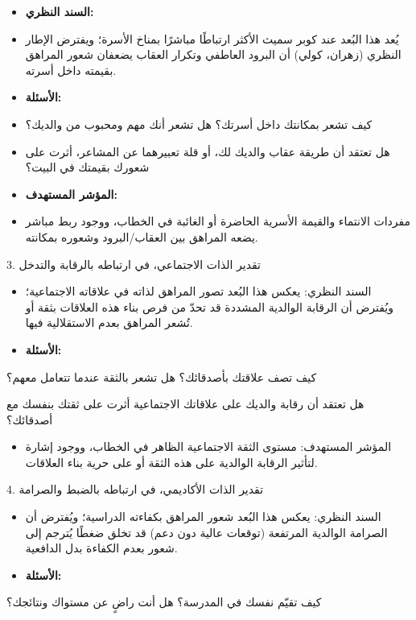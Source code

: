 \documentclass[12pt,oneside]{report}
\begin{document}
\begin{itemize}[leftmargin=1.6em,itemsep=1pt]
\item \textbf{السند النظري:}
\item يُعد هذا البُعد عند كوبر سميث الأكثر ارتباطًا مباشرًا بمناخ الأسرة؛ ويفترض الإطار النظري (زهران، كولي) أن البرود العاطفي وتكرار العقاب يضعفان شعور المراهق بقيمته داخل أسرته.
\item \textbf{الأسئلة:}
\item كيف تشعر بمكانتك داخل أسرتك؟ هل تشعر أنك مهم ومحبوب من والديك؟
\item هل تعتقد أن طريقة عقاب والديك لك، أو قلة تعبيرهما عن المشاعر، أثرت على شعورك بقيمتك في البيت؟
\item \textbf{المؤشر المستهدف:}
\item مفردات الانتماء والقيمة الأسرية الحاضرة أو الغائبة في الخطاب، ووجود ربط مباشر يضعه المراهق بين العقاب/البرود وشعوره بمكانته.
\end{itemize}
3. تقدير الذات الاجتماعي، في ارتباطه بالرقابة والتدخل

\begin{itemize}[leftmargin=1.6em,itemsep=1pt]
\item السند النظري: يعكس هذا البُعد تصور المراهق لذاته في علاقاته الاجتماعية؛ ويُفترض أن الرقابة الوالدية المشددة قد تحدّ من فرص بناء هذه العلاقات بثقة أو تُشعر المراهق بعدم الاستقلالية فيها.
\item \textbf{الأسئلة:}
\end{itemize}
كيف تصف علاقتك بأصدقائك؟ هل تشعر بالثقة عندما تتعامل معهم؟

هل تعتقد أن رقابة والديك على علاقاتك الاجتماعية أثرت على ثقتك بنفسك مع أصدقائك؟

\begin{itemize}[leftmargin=1.6em,itemsep=1pt]
\item المؤشر المستهدف: مستوى الثقة الاجتماعية الظاهر في الخطاب، ووجود إشارة لتأثير الرقابة الوالدية على هذه الثقة أو على حرية بناء العلاقات.
\end{itemize}
4. تقدير الذات الأكاديمي، في ارتباطه بالضبط والصرامة

\begin{itemize}[leftmargin=1.6em,itemsep=1pt]
\item السند النظري: يعكس هذا البُعد شعور المراهق بكفاءته الدراسية؛ ويُفترض أن الصرامة الوالدية المرتفعة (توقعات عالية دون دعم) قد تخلق ضغطًا يُترجم إلى شعور بعدم الكفاءة بدل الدافعية.
\item \textbf{الأسئلة:}
\end{itemize}
كيف تقيّم نفسك في المدرسة؟ هل أنت راضٍ عن مستواك ونتائجك؟
\end{document}
